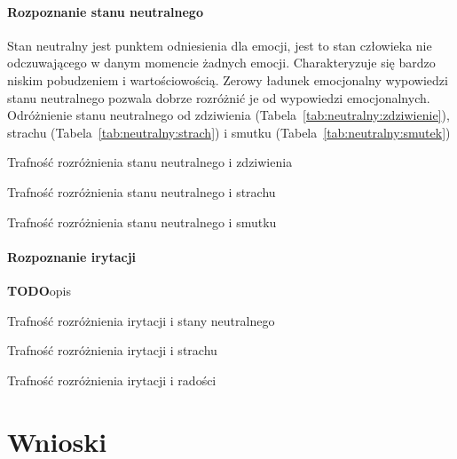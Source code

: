 \documentclass[a4paper,12pt,twoside,openany]{report}
\newcommand{\TODO}{\textbf{TODO}}
\newcommand*\NewPage{\newpage\null\thispagestyle{empty}\newpage}
\newcommand{\Tab}[1]{(Tabela~\ref{#1})}
\begin{document}
\subsubsection{Rozpoznanie stanu neutralnego}
Stan neutralny jest punktem odniesienia dla emocji, jest to stan człowieka nie odczuwającego w danym momencie żadnych emocji.
Charakteryzuje się bardzo niskim pobudzeniem i wartościowością.
Zerowy ładunek emocjonalny wypowiedzi stanu neutralnego pozwala dobrze rozróżnić je od wypowiedzi emocjonalnych. 
Odróżnienie stanu neutralnego od zdziwienia \Tab{tab:neutralny:zdziwienie}, strachu \Tab{tab:neutralny:strach} i smutku \Tab{tab:neutralny:smutek}

\begin{table}[hc!]
	\centering
	
	\caption{Trafność rozróżnienia stanu neutralnego i zdziwienia}
	\label{tab:neutralny:zdziwienie}
\end{table}
\begin{table}[hc!]
	\centering
	
	\caption{Trafność rozróżnienia stanu neutralnego i strachu}
	\label{tab:neutralny:strach}
\end{table}
\begin{table}[hc!]
	\centering
	
	\caption{Trafność rozróżnienia stanu neutralnego i smutku}
	\label{tab:neutralny:smutek}
\end{table}
\subsubsection{Rozpoznanie irytacji}
\TODO{opis}
\begin{table}[hc!]
	\centering
	
	\caption{Trafność rozróżnienia irytacji i stany neutralnego}
	\label{tab:smutek:neutralny}
\end{table}
\begin{table}[hc!]
	\centering
	
	\caption{Trafność rozróżnienia irytacji i strachu}
	\label{tab:smutek:neutralny}
\end{table}
\begin{table}[hc!]
	\centering
	
	\caption{Trafność rozróżnienia irytacji i radości}
	\label{tab:smutek:neutralny}
\end{table}
\chapter{Wnioski}
\NewPage
\NewPage

{}

\end{document}
